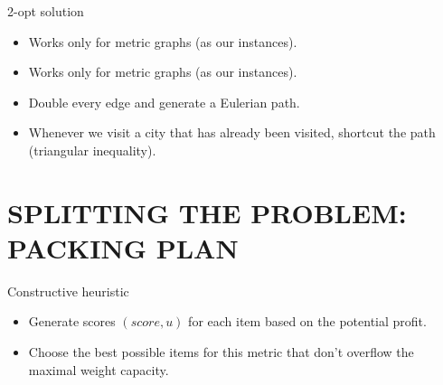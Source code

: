 \documentclass[newPxFont]{beamer}
\begin{document}
\begin{frame}[c]{2-opt solution}
\vspace{-2em}

	\begin{itemize}
	\item Works only for metric graphs (as our instances).
	\item Works only for metric graphs (as our instances).
	\item Double every edge and generate a Eulerian path.
	\item Whenever we visit a city that has already been visited, shortcut the path (triangular inequality).
	\end{itemize}
	\vspace{2em}
\end{frame}


%
%

\section{\textup{SPLITTING THE PROBLEM: PACKING PLAN}}

\begin{frame}[c]{Constructive heuristic}
\vspace{-2em}

\begin{itemize}
	\item Generate scores $(score, u)$ for each item based on the potential profit.
	\item Choose the best possible items for this metric that don't overflow the maximal weight capacity.
\end{itemize}
\vspace{2em}
\end{frame}

\end{document}
